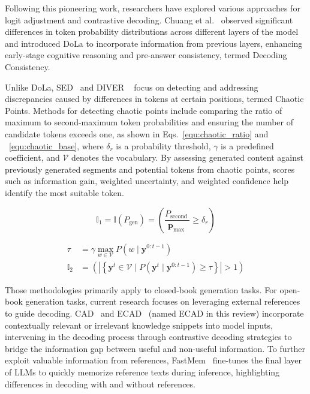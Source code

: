 \documentclass[lettersize,journal]{IEEEtran}
\begin{document}
Following this pioneering work, researchers have explored various approaches for logit adjustment and contrastive decoding. Chuang et al.~\cite{DoLa_24_ICLR_MIT} observed significant differences in token probability distributions across different layers of the model and introduced DoLa to incorporate information from previous layers, enhancing early-stage cognitive reasoning and pre-answer consistency, termed Decoding Consistency.

Unlike DoLa, SED~\cite{SED_24_arXiv_FDU} and DIVER ~\cite{DIVER_24_arXiv_IA} focus on detecting and addressing discrepancies caused by differences in tokens at certain positions, termed Chaotic Points. Methods for detecting chaotic points include comparing the ratio of maximum to second-maximum token probabilities and ensuring the number of candidate tokens exceeds one, as shown in Eqs.~\ref{equ:chaotic_ratio} and ~\ref{equ:chaotic_base}, where $\delta_r$ is a probability threshold, $\gamma$ is a predefined coefficient, and $\mathcal{V}$ denotes the vocabulary. By assessing generated content against previously generated segments and potential tokens from chaotic points, scores such as information gain, weighted uncertainty, and weighted confidence help identify the most suitable token.

\begin{equation}
\label{equ:chaotic_ratio}
\mathbb{I}_1=\mathbb{I}\left(P_{\text {gen}}\right)=\left(\frac{P_{\text {second }}}{\boldsymbol{p}_{\text {max }}} \geq \delta_r\right)
\end{equation}

\begin{equation}\label{equ:chaotic_base}
\begin{aligned}
\tau &= \gamma \max_{w \in \mathcal{V}} P\left( w \mid \boldsymbol{y}^{0:t-1}\right) \\
\mathbb{I}_2 &= \left( \left| \left\{ \boldsymbol{y}^t \in \mathcal{V} \mid P\left( \boldsymbol{y}^t \mid \boldsymbol{y}^{0:t-1}\right) \geq \tau \right\} \right| > 1 \right)
\end{aligned}
\end{equation}


Those methodologies primarily apply to closed-book generation tasks. For open-book generation tasks, current research focuses on leveraging external references to guide decoding. CAD~\cite{ContextAwareD_23_arXiv_Washington} and ECAD~\cite{ContextDecode_24_arXiv_Edin} (named ECAD in this review) incorporate contextually relevant or irrelevant knowledge snippets into model inputs, intervening in the decoding process through contrastive decoding strategies to bridge the information gap between useful and non-useful information. To further exploit valuable information from references, FastMem~\cite{FastMem_24_arXiv_KUL} fine-tunes the final layer of LLMs to quickly memorize reference texts during inference, highlighting differences in decoding with and without references.
\end{document}
